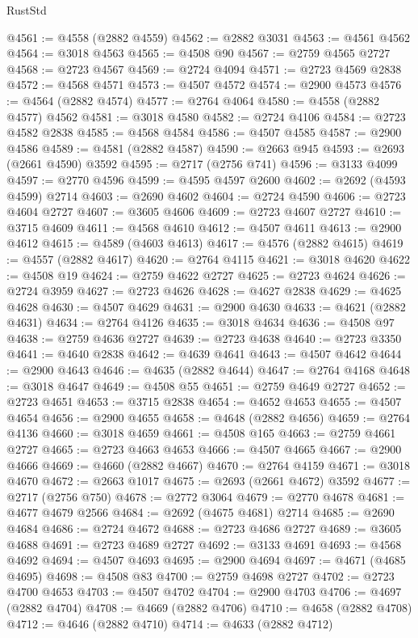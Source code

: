 \begin{lexlean}{RustStd}
\begin{coremodule}
@4561 := @4558 (@2882 @4559)
@4562 := @2882 @3031
@4563 := @4561 @4562
@4564 := @3018 @4563
@4565 := @4508 @90
@4567 := @2759 @4565 @2727
@4568 := @2723 @4567
@4569 := @2724 @4094
@4571 := @2723 @4569 @2838
@4572 := @4568 @4571
@4573 := @4507 @4572
@4574 := @2900 @4573
@4576 := @4564 (@2882 @4574)
@4577 := @2764 @4064
@4580 := @4558 (@2882 @4577) @4562
@4581 := @3018 @4580
@4582 := @2724 @4106
@4584 := @2723 @4582 @2838
@4585 := @4568 @4584
@4586 := @4507 @4585
@4587 := @2900 @4586
@4589 := @4581 (@2882 @4587)
@4590 := @2663 @945
@4593 := @2693 (@2661 @4590) @3592
@4595 := @2717 (@2756 @741)
@4596 := @3133 @4099
@4597 := @2770 @4596
@4599 := @4595 @4597 @2600
@4602 := @2692 (@4593 @4599) @2714
@4603 := @2690 @4602
@4604 := @2724 @4590
@4606 := @2723 @4604 @2727
@4607 := @3605 @4606
@4609 := @2723 @4607 @2727
@4610 := @3715 @4609
@4611 := @4568 @4610
@4612 := @4507 @4611
@4613 := @2900 @4612
@4615 := @4589 (@4603 @4613)
@4617 := @4576 (@2882 @4615)
@4619 := @4557 (@2882 @4617)
@4620 := @2764 @4115
@4621 := @3018 @4620
@4622 := @4508 @19
@4624 := @2759 @4622 @2727
@4625 := @2723 @4624
@4626 := @2724 @3959
@4627 := @2723 @4626
@4628 := @4627 @2838
@4629 := @4625 @4628
@4630 := @4507 @4629
@4631 := @2900 @4630
@4633 := @4621 (@2882 @4631)
@4634 := @2764 @4126
@4635 := @3018 @4634
@4636 := @4508 @97
@4638 := @2759 @4636 @2727
@4639 := @2723 @4638
@4640 := @2723 @3350
@4641 := @4640 @2838
@4642 := @4639 @4641
@4643 := @4507 @4642
@4644 := @2900 @4643
@4646 := @4635 (@2882 @4644)
@4647 := @2764 @4168
@4648 := @3018 @4647
@4649 := @4508 @55
@4651 := @2759 @4649 @2727
@4652 := @2723 @4651
@4653 := @3715 @2838
@4654 := @4652 @4653
@4655 := @4507 @4654
@4656 := @2900 @4655
@4658 := @4648 (@2882 @4656)
@4659 := @2764 @4136
@4660 := @3018 @4659
@4661 := @4508 @165
@4663 := @2759 @4661 @2727
@4665 := @2723 @4663 @4653
@4666 := @4507 @4665
@4667 := @2900 @4666
@4669 := @4660 (@2882 @4667)
@4670 := @2764 @4159
@4671 := @3018 @4670
@4672 := @2663 @1017
@4675 := @2693 (@2661 @4672) @3592
@4677 := @2717 (@2756 @750)
@4678 := @2772 @3064
@4679 := @2770 @4678
@4681 := @4677 @4679 @2566
@4684 := @2692 (@4675 @4681) @2714
@4685 := @2690 @4684
@4686 := @2724 @4672
@4688 := @2723 @4686 @2727
@4689 := @3605 @4688
@4691 := @2723 @4689 @2727
@4692 := @3133 @4691
@4693 := @4568 @4692
@4694 := @4507 @4693
@4695 := @2900 @4694
@4697 := @4671 (@4685 @4695)
@4698 := @4508 @83
@4700 := @2759 @4698 @2727
@4702 := @2723 @4700 @4653
@4703 := @4507 @4702
@4704 := @2900 @4703
@4706 := @4697 (@2882 @4704)
@4708 := @4669 (@2882 @4706)
@4710 := @4658 (@2882 @4708)
@4712 := @4646 (@2882 @4710)
@4714 := @4633 (@2882 @4712)

\end{coremodule}
\end{lexlean}
